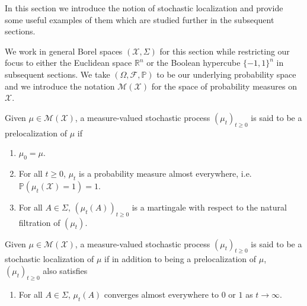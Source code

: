 In this section we introduce the notion of stochastic localization and provide some useful examples of 
them which are studied further in the subsequent sections. 

We work in general Borel spaces \((\mathcal{X}, \Sigma)\) for this section while restricting our 
focus to either the Euclidean space \(\mathbb{R}^n\) or the Boolean hypercube \(\{-1, 1\}^n\) 
in subsequent sections. We take \((\Omega, \mathscr{F}, \mathbb{P})\) to be our underlying probability space 
and we introduce the notation \(\mathcal{M}(\mathcal{X})\) for the space of probability measures on 
\(\mathcal{X}\).

\begin{definition}
  Given \(\mu \in \mathcal{M}(\mathcal{X})\), a measure-valued stochastic process 
  \((\mu_t)_{t \ge 0}\) is said to be a prelocalization of \(\mu\) if 
  \begin{enumerate}[label=L\arabic*, start=0]
    \item \label{L0} \(\mu_0 = \mu\).
    \item \label{L1} For all \(t \ge 0\), \(\mu_t\) is a probability measure almost everywhere, i.e. 
      \(\mathbb{P}(\mu_t(\mathcal{X}) = 1) = 1\).
    \item \label{L2} For all \(A \in \Sigma\), \((\mu_t(A))_{t \ge 0}\) is a martingale with respect 
      to the natural filtration of \((\mu_t)\).
  \end{enumerate}
\end{definition}

\begin{definition}
  Given \(\mu \in \mathcal{M}(\mathcal{X})\), a measure-valued stochastic process 
  \((\mu_t)_{t \ge 0}\) is said to be a stochastic localization of \(\mu\) if in addition to being a 
  prelocalization of \(\mu\), \((\mu_t)_{t \ge 0}\) also satisfies
  \begin{enumerate}[label=L\arabic*, start=3]
    \item \label{L3} For all \(A \in \Sigma\), \(\mu_t(A)\) converges almost everywhere to \(0\) 
      or \(1\) as \(t \to \infty\).
  \end{enumerate}
\end{definition}


